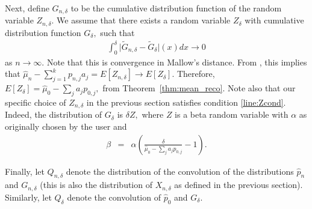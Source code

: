 \documentclass[12pt]{article} %
\newcommand{\comH}[1]{{\noindent \color{blue}#1}}
\begin{document}
Next, define $G_{n,\delta}$ to be the cumulative distribution function of the random variable $Z_{n, \delta}.$   We assume that there exists a random variable $Z_\delta$ with cumulative distribution function $G_\delta,$ such that  
\begin{eqnarray}\label{line:Zcond}
\int_0^\delta \vert \widetilde G_{n,\delta}-\widetilde G_{\delta} \vert(x) dx \rightarrow 0
\end{eqnarray}
as $n\rightarrow \infty.$  Note that this is convergence in Mallow's distance.   From \citet[Lemma 8.3]{bickel84}, this implies that  $\widehat \mu_n -\sum_{j=1}^k p_{n,j}a_j = E[Z_{n,\delta}] \rightarrow E[Z_\delta].$   Therefore, $E[Z_\delta]=\widehat \mu_0 -\sum_j a_j p_{0,j},$ from Theorem~\ref{thm:mean_reco}.  Note also that our specific choice of $Z_{n,\delta}$ in the previous section satisfies condition \eqref{line:Zcond}.     Indeed, the distribution of $G_\delta$ is $\delta Z,$ where $Z$ is a beta random variable with $\alpha$ as originally chosen by the user and
\begin{eqnarray*}
\beta &=& \alpha \left(\frac{\delta}{\widehat \mu_0 - \sum_j a_j p_{0,j}}-1\right).
\end{eqnarray*}




Finally, let $Q_{n,\delta}$ denote the distribution of the convolution of the distributions $\widehat p_n$ and $G_{n,
\delta}$ (this is also the distribution of $X_{n,\delta}$ as defined in the previous section).  Similarly, let $Q_{\delta}$ denote the convolution of $\widehat p_0$ and $G_{
\delta}$. 


\end{document}
